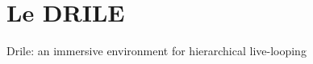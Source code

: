 \section{Le DRILE}
\begin{frame}
Drile: an immersive environment for hierarchical live-looping
\end{frame}
